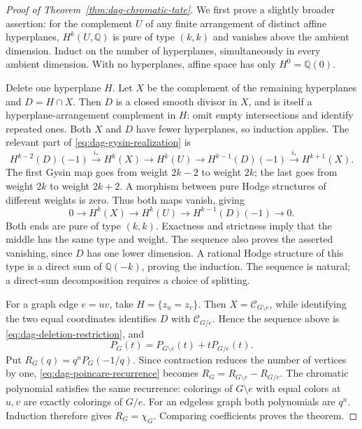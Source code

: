 \documentclass[11pt]{article}
\theoremstyle{definition}
\theoremstyle{remark}
\newcommand{\Q}{\mathbb Q}
\begin{document}
\begin{proof}[Proof of Theorem~\ref{thm:dag-chromatic-tate}]
We first prove a slightly broader assertion: for the complement $U$ of
any finite arrangement of distinct affine hyperplanes, $H^k(U,\Q)$ is
pure of type $(k,k)$ and vanishes above the ambient dimension.
Induct on the number of hyperplanes, simultaneously
in every ambient dimension. With no hyperplanes, affine space has only
$H^0=\Q(0)$.

Delete one hyperplane $H$. Let $X$ be the complement of the remaining
hyperplanes and $D=H\cap X$. Then $D$ is a closed smooth divisor in $X$,
and is itself a hyperplane-arrangement complement in $H$: omit empty
intersections and identify repeated ones. Both $X$ and $D$ have fewer
hyperplanes, so induction applies. The relevant part of
\eqref{eq:dag-gysin-realization} is
\[
 H^{k-2}(D)(-1)\xrightarrow{i_*}H^k(X)
 \longrightarrow H^k(U)\longrightarrow H^{k-1}(D)(-1)
 \xrightarrow{i_*}H^{k+1}(X).
\]
The first Gysin map goes from weight $2k-2$ to weight $2k$; the last goes
from weight $2k$ to weight $2k+2$. A morphism between pure Hodge structures
of different weights is zero. Thus both maps vanish, giving
\[
 0\longrightarrow H^k(X)\longrightarrow H^k(U)
 \longrightarrow H^{k-1}(D)(-1)\longrightarrow0.
\]
Both ends are pure of type $(k,k)$. Exactness and strictness imply that the
middle has the same type and weight. The sequence also proves the asserted
vanishing, since $D$ has one lower dimension. A rational Hodge structure
of this type is a direct sum of $\Q(-k)$, proving the induction. The sequence is
natural; a direct-sum decomposition requires a choice of splitting.

For a graph edge $e=uv$, take $H=\{z_u=z_v\}$.
Then $X=\mathcal C_{G\setminus e}$, while identifying the two equal
coordinates identifies $D$ with $\mathcal C_{G/e}$. Hence the sequence
above is \eqref{eq:dag-deletion-restriction}, and
\begin{equation}\label{eq:dag-poincare-recurrence}
 P_G(t)=P_{G\setminus e}(t)+tP_{G/e}(t).
\end{equation}
Put $R_G(q)=q^nP_G(-1/q)$. Since contraction reduces the number of vertices
by one, \eqref{eq:dag-poincare-recurrence} becomes
$R_G=R_{G\setminus e}-R_{G/e}$.
The chromatic polynomial satisfies the same recurrence: colorings of
$G\setminus e$ with equal colors at $u,v$ are exactly colorings of $G/e$.
For an edgeless graph both polynomials are $q^n$. Induction therefore gives
$R_G=\chi_G$. Comparing coefficients proves the theorem.
\end{proof}
\end{document}
